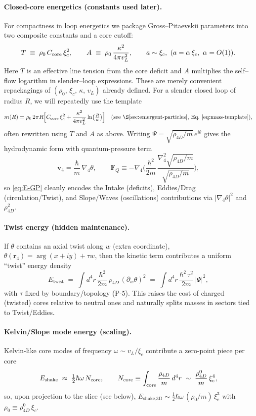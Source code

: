 \paragraph*{Closed-core energetics (constants used later).}
For compactness in loop energetics we package Gross–Pitaevskii parameters into two composite constants and a core cutoff:
\[
T\;\equiv\;\rho_0\,C_{\rm core}\,\xi_c^2,\qquad
A\;\equiv\;\rho_0\,\frac{\kappa^2}{4\pi v_L^2},\qquad
a\sim\xi_c,\ (a=\alpha\,\xi_c,\ \alpha=O(1)).
\]
Here $T$ is an effective line tension from the core deficit and $A$ multiplies the self–flow logarithm in slender–loop expressions. These are merely convenient repackagings of $(\rho_0,\,\xi_c,\,\kappa,\,v_L)$ already defined.
For a slender closed loop of radius $R$, we will repeatedly use the template
\[
 m(R)=\rho_0\,2\pi R\Big[C_{\rm core}\,\xi_c^2+\frac{\kappa^2}{4\pi v_L^2}\ln\!\big(\tfrac{R}{a}\big)\Big]
 \quad\text{(see \S\ref{sec:emergent-particles}, Eq.~\eqref{eq:mass-template})},
\]
often rewritten using $T$ and $A$ as above.
Writing $\Psi=\sqrt{\rho_{4D}/m}\,e^{i\theta}$ gives the hydrodynamic form with quantum-pressure term
\[
\mathbf v_4=\frac{\hbar}{m}\,\nabla_4\theta,\qquad
\mathbf F_Q \equiv -\nabla_4\!\Big(\frac{\hbar^2}{2m}\,\frac{\nabla_4^2\sqrt{\rho_{4D}/m}}{\sqrt{\rho_{4D}/m}}\Big),
\]
so \eqref{eq:E-GP} cleanly encodes the Intake (deficits), Eddies/Drag (circulation/Twist), and Slope/Waves (oscillations) contributions via $|\nabla_4\theta|^2$ and $\rho_{4D}^2$.

\paragraph{Twist energy (hidden maintenance).}
If $\theta$ contains an axial twist along $w$ (extra coordinate), $\theta(\mathbf r_4)=\arg(x+iy)+\tau w$, then the kinetic term contributes a uniform ``twist'' energy density
\begin{equation}
E_{\text{twist}} \;=\; \int d^4 r\, \frac{\hbar^2}{2m}\,\rho_{4D}\,(\partial_w\theta)^2
\;=\; \int d^4 r\, \frac{\hbar^2\,\tau^2}{2m}\,|\Psi|^2 ,
\end{equation}
with $\tau$ fixed by boundary/topology (P-5). This raises the cost of charged (twisted) cores relative to neutral ones and naturally splits masses in sectors tied to Twist/Eddies.

\paragraph{Kelvin/Slope mode energy (scaling).}
Kelvin-like core modes of frequency $\omega\sim v_L/\xi_c$ contribute a zero-point piece per core
\begin{equation}
E_{\text{shake}} \;\approx\; \tfrac{1}{2}\hbar\omega\,N_{\rm core},
\qquad
N_{\rm core} \equiv \int_{\text{core}} \frac{\rho_{4D}}{m}\,d^4 r
\;\sim\; \frac{\rho_{4D}^0}{m}\,\xi_c^4,
\end{equation}
so, upon projection to the slice (see below), $E_{\text{shake,3D}}\sim \tfrac{1}{2}\hbar\omega\,(\rho_0/m)\,\xi_c^3$ with $\rho_0\equiv \rho_{4D}^0\,\xi_c$.

